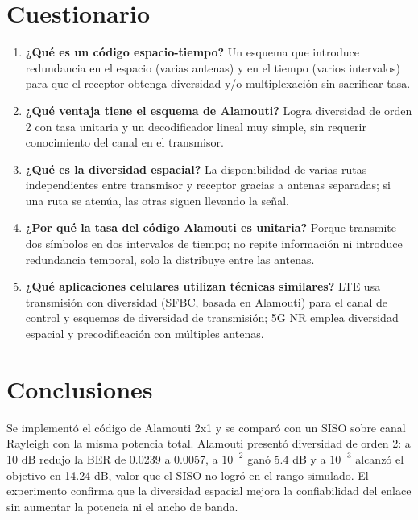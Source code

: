 \documentclass[11pt,a4paper]{article}
\begin{document}
\section{Cuestionario}

\begin{enumerate}
  \item \textbf{¿Qué es un código espacio-tiempo?} Un esquema que introduce redundancia en
        el espacio (varias antenas) y en el tiempo (varios intervalos) para que el receptor
        obtenga diversidad y/o multiplexación sin sacrificar tasa.
  \item \textbf{¿Qué ventaja tiene el esquema de Alamouti?} Logra diversidad de orden 2 con
        tasa unitaria y un decodificador lineal muy simple, sin requerir conocimiento del
        canal en el transmisor.
  \item \textbf{¿Qué es la diversidad espacial?} La disponibilidad de varias rutas
        independientes entre transmisor y receptor gracias a antenas separadas; si una ruta
        se atenúa, las otras siguen llevando la señal.
  \item \textbf{¿Por qué la tasa del código Alamouti es unitaria?} Porque transmite dos
        símbolos en dos intervalos de tiempo; no repite información ni introduce redundancia
        temporal, solo la distribuye entre las antenas.
  \item \textbf{¿Qué aplicaciones celulares utilizan técnicas similares?} LTE usa
        transmisión con diversidad (SFBC, basada en Alamouti) para el canal de control y
        esquemas de diversidad de transmisión; 5G NR emplea diversidad espacial y
        precodificación con múltiples antenas.
\end{enumerate}

\section{Conclusiones}

Se implementó el código de Alamouti 2x1 y se comparó con un SISO sobre canal Rayleigh con
la misma potencia total. Alamouti presentó diversidad de orden 2: a 10 dB redujo la BER de
0.0239 a 0.0057, a $10^{-2}$ ganó 5.4 dB y a $10^{-3}$ alcanzó el objetivo en 14.24 dB,
valor que el SISO no logró en el rango simulado. El experimento confirma que la diversidad
espacial mejora la confiabilidad del enlace sin aumentar la potencia ni el ancho de banda.
\end{document}
